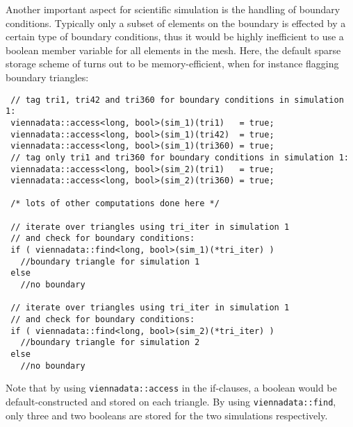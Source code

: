 Another important aspect for scientific simulation is the handling of boundary conditions. Typically only a subset of elements on the boundary is effected by a certain type of boundary conditions, thus it would be highly inefficient to use a boolean member variable for all elements in the mesh. Here, the default sparse storage scheme of {\ViennaData} turns out to be memory-efficient, when for instance flagging boundary triangles:
\begin{lstlisting}
 // tag tri1, tri42 and tri360 for boundary conditions in simulation 1:
 viennadata::access<long, bool>(sim_1)(tri1)   = true; 
 viennadata::access<long, bool>(sim_1)(tri42)  = true; 
 viennadata::access<long, bool>(sim_1)(tri360) = true; 
 // tag only tri1 and tri360 for boundary conditions in simulation 1:
 viennadata::access<long, bool>(sim_2)(tri1)   = true; 
 viennadata::access<long, bool>(sim_2)(tri360) = true; 

 /* lots of other computations done here */

 // iterate over triangles using tri_iter in simulation 1
 // and check for boundary conditions:
 if ( viennadata::find<long, bool>(sim_1)(*tri_iter) )
   //boundary triangle for simulation 1
 else
   //no boundary

 // iterate over triangles using tri_iter in simulation 1
 // and check for boundary conditions:
 if ( viennadata::find<long, bool>(sim_2)(*tri_iter) )
   //boundary triangle for simulation 2
 else
   //no boundary
\end{lstlisting}
Note that by using \lstinline|viennadata::access| in the if-clauses, a boolean would be default-constructed and stored on each triangle. By using \lstinline|viennadata::find|, only three and two booleans are stored for the two simulations respectively.

